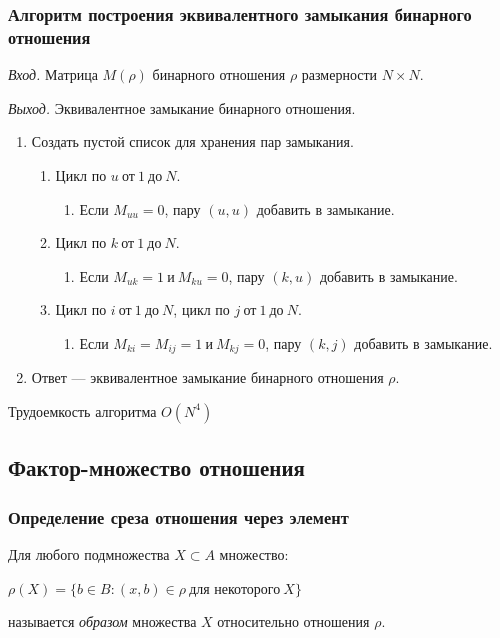 \documentclass[bachelor, och, labwork]{shiza}
\begin{document}
\subsubsection{Алгоритм построения эквивалентного замыкания бинарного отношения}

\textit{Вход.} Матрица $M(\rho)$ бинарного отношения $\rho$ размерности
$N \times N$.

\textit{Выход.} Эквивалентное замыкание бинарного отношения.

\begin{enumerate}
    \item Создать пустой список для хранения пар замыкания.
    \begin{enumerate}[label=a)]
        \item Цикл по $u ~\text{от}~ 1 ~\text{до}~ N$.
        \begin{enumerate}[label=1.]\item Если $M_{uu} = 0$, пару $(u, u)$ добавить в замыкание.\end{enumerate} 
        \item Цикл по $k ~\text{от}~ 1 ~\text{до}~ N$.
        \begin{enumerate}[label=1.]\item Если $M_{uk} = 1 ~\text{и}~ M_{ku} = 0 $, пару $(k, u)$ добавить в замыкание.\end{enumerate}
        \item Цикл по $i ~\text{от}~ 1 ~\text{до}~ N$, цикл по $j ~\text{от}~ 1 ~\text{до}~ N$.
        \begin{enumerate}[label=1.]\item Если $M_{ki} = M_{ij} = 1 ~\text{и}~ M_{kj} = 0$, пару $(k, j)$ добавить в замыкание.\end{enumerate} 
    \end{enumerate}
    \item Ответ --- эквивалентное замыкание бинарного отношения $\rho$.
\end{enumerate}
Трудоемкость алгоритма $O(N^4)$

\subsection{Фактор-множество отношения}

\subsubsection{Определение среза отношения через элемент}
Для любого подмножества $X \subset A$ множество:
\begin{center} $\rho(X)=\{b \in B:(x,b)\in \rho ~\text{для некоторого}~ X\}$ \end{center}
называется \textit{образом} множества $X$ относительно отношения $\rho$.
\end{document}

